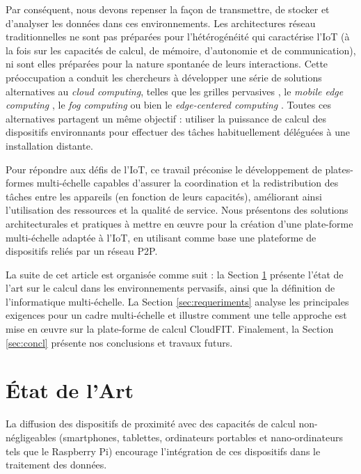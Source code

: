 Par conséquent, nous devons repenser la façon de transmettre, de stocker et d'analyser les données dans ces environnements. Les architectures réseau traditionnelles ne sont pas préparées pour l'hétérogénéité qui caractérise l'IoT (à la fois sur les capacités de calcul, de mémoire, d'autonomie et de communication), ni sont elles préparées pour la nature spontanée de leurs interactions. Cette préoccupation a conduit les chercheurs à développer une série de solutions alternatives au \textit{cloud computing}, telles que les grilles pervasives \cite{Parashar2010}, le \textit{mobile edge computing} \cite {Dey2013,MEC,Satyanarayanan09}, le \textit{fog computing} \cite{Bonomi2012} ou bien le \textit{edge-centered computing} \cite{Lopez2015}. Toutes ces alternatives partagent un même objectif : utiliser la puissance de calcul des dispositifs environnants pour effectuer des tâches habituellement déléguées à une installation distante. 

Pour répondre aux défis de l'IoT, ce travail préconise le développement de plates-formes multi-échelle capables d'assurer la coordination et la redistribution des tâches entre les appareils (en fonction de leurs capacités), améliorant ainsi l'utilisation des ressources et la qualité de service. Nous présentons des solutions architecturales et pratiques à mettre en \oe{}uvre pour la création d'une plate-forme multi-échelle adaptée à l'IoT, en utilisant comme base une plateforme de dispositifs reliés par un réseau P2P.

La suite de cet article est organisée comme suit : la Section \ref{sec:definitions} présente l'état de l'art sur le calcul dans les environnements pervasifs, ainsi que la définition de l'informatique multi-échelle. La Section \ref{sec:requeriments} analyse les principales exigences pour un cadre multi-échelle et illustre comment une telle approche est mise en \oe{}uvre sur la plate-forme de calcul CloudFIT. Finalement, la Section \ref{sec:concl} présente nos conclusions et travaux futurs.


\section{État de l'Art}\label{sec:definitions}

La diffusion des dispositifs de proximité avec des capacités de calcul non-négligeables (smartphones, tablettes, ordinateurs portables et nano-ordinateurs tels que le Raspberry Pi) encourage l'intégration de ces dispositifs dans le traitement des données. %


